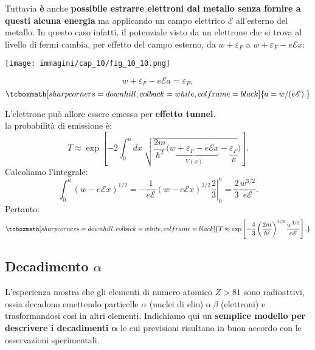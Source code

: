 \documentclass[a4paper,12pt,oneside]{book}
\begin{document}
Tuttavia \textbf{è} anche \textbf{possibile estrarre elettroni dal metallo senza fornire a questi alcuna energia} ma applicando un campo elettrico $\mathscr{E}$ all'esterno del metallo. In questo caso infatti, il potenziale visto da un elettrone che si trova al livello di fermi cambia, per effetto del campo esterno, da $w+\varepsilon _F$ a $w+\varepsilon _F-e\mathscr{E}x$:\\
\vspace{.5cm}
\begin{minipage}{.6\textwidth}
\texttt{[image: immagini/cap\_10/fig\_10\_10.png]}
\end{minipage}
\begin{minipage}{.4\textwidth}
\begin{equation}
w+\varepsilon _F-e\mathscr{E}a=\varepsilon _F ,
\end{equation}
\begin{equation}
\tcboxmath[sharp corners=downhill, colback=white, colframe=black]{
a= w/(e\mathscr{E}) .
}
\end{equation}
\end{minipage}
L'elettrone può allore essere emesso per \textbf{effetto tunnel}.\\
la probabilità di emissione è:
	\begin{equation}
		T \approx \exp \left[-2 \int_{0} ^{a} dx\ \sqrt{\frac{2m}{\hbar ^2} (\underbrace{w+\varepsilon _F-e\mathscr{E}x}_{V(x)}-\underbrace{\varepsilon _F}_{E}})\right].
	\end{equation}
Calcoliamo l'integrale:
	\begin{equation}
		\int _{0} ^{a} \left( w-e\mathscr{E}x \right) ^{1/2}= \left. -\frac{1}{e\mathscr{E}}\left( w-e\mathscr{E}x \right) ^{3/2}\frac{2}{3}\right| _0 ^a =\frac{2}{3}\frac{w^{3/2}}{e\mathscr{E}}.
	\end{equation}
Pertanto:
	\begin{equation}
		\tcboxmath[sharp corners=downhill, colback=white, colframe=black]{
		T \approx \exp \left[-\frac{4}{3}\left(\frac{2m}{\hbar ^2}\right)^{1/2}\frac{w^{3/2}}{e\mathscr{E}}\right].
		}
	\end{equation}
\subsection{Decadimento $\alpha$}
L'esperienza mostra che gli elementi di numero atomico $Z>81$ sono radioattivi, ossia decadono emettendo particelle $\alpha$ (nuclei di elio) o $\beta$ (elettroni) e trasformandosi così in altri elementi. Indichiamo qui un \textbf{semplice modello per descrivere i decadimenti} $\mathbf{\alpha}$ le cui previsioni risultano in buon accordo con le osservazioni sperimentali.\\
\end{document}
